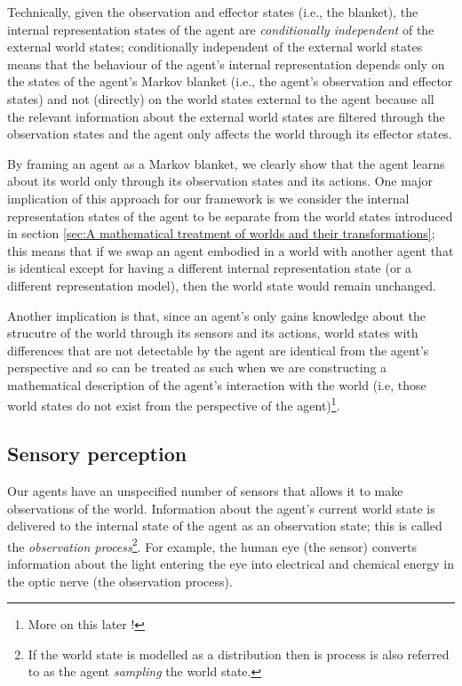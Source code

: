 Technically, given the observation and effector states (i.e., the blanket), the internal representation states of the agent are \emph{conditionally independent} of the external world states; conditionally independent of the external world states means that the behaviour of the agent's internal representation depends only on the states of the agent's Markov blanket (i.e., the agent's observation and effector states) and not (directly) on the world states external to the agent because all the relevant information about the external world states are filtered through the observation states and the agent only affects the world through its effector states.

By framing an agent as a Markov blanket, we clearly show that the agent learns about its world only through its observation states and its actions.
One major implication of this approach for our framework is we consider the internal representation states of the agent to be separate from the world states introduced in section \ref{sec:A mathematical treatment of worlds and their transformations}; this means that if we swap an agent embodied in a world with another agent that is identical except for having a different internal representation state (or a different representation model), then the world state would remain unchanged.

Another implication is that, since an agent's only gains knowledge about the strucutre of the world through its sensors and its actions, world states with differences that are not detectable by the agent are identical from the agent's perspective and so can be treated as such when we are constructing a mathematical description of the agent's interaction with the world (i.e, those world states do not exist from the perspective of the agent)\footnote{More on this later !}.

\subsection{Sensory perception}

Our agents have an unspecified number of sensors that allows it to make observations of the world.
Information about the agent's current world state is delivered to the internal state of the agent as an observation state; this is called the \emph{observation process}\footnote{If the world state is modelled as a distribution then is process is also referred to as the agent \emph{sampling} the world state.}.
For example, the human eye (the sensor) converts information about the light entering the eye into
electrical and chemical energy in the optic nerve (the observation process).

